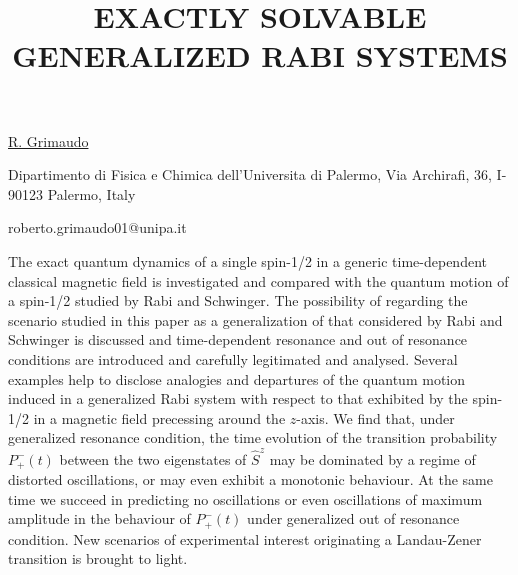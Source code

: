\title{EXACTLY SOLVABLE GENERALIZED RABI SYSTEMS}

\underline{R. Grimaudo} 

{\normalsize{\vspace{-4mm}
Dipartimento di Fisica e Chimica dell'Universita di Palermo, Via Archirafi, 36, I-90123 Palermo, Italy

\email roberto.grimaudo01@unipa.it}}

The exact quantum dynamics of a single spin-1/2 in a generic time-dependent classical magnetic field is investigated and compared with the quantum motion of a spin-1/2 studied by Rabi and Schwinger.
The possibility of regarding the scenario studied in this paper as a generalization of that considered by Rabi and Schwinger is discussed and time-dependent resonance and out of resonance conditions are introduced and carefully legitimated and analysed.
Several examples help to disclose analogies and departures of the quantum motion induced in a generalized Rabi system with respect to that exhibited by the spin-1/2 in a magnetic field precessing around the $z$-axis.
We find that, under generalized resonance condition, the time evolution of the transition probability $P_+^-(t)$ between the two eigenstates of $\hat{S}^z$ may be dominated by a regime of distorted oscillations, or may even exhibit a monotonic behaviour.
At the same time we succeed in predicting no oscillations or even oscillations of maximum amplitude in the behaviour of $P_+^-(t)$ under generalized out of resonance condition.
New scenarios of experimental interest originating a Landau-Zener transition is brought to light.

\vspace{\baselineskip} 